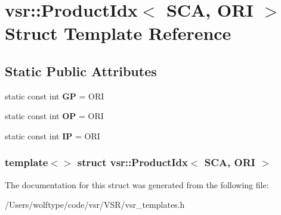 \hypertarget{structvsr_1_1_product_idx_3_01_s_c_a_00_01_o_r_i_01_4}{\section{vsr\-:\-:Product\-Idx$<$ S\-C\-A, O\-R\-I $>$ Struct Template Reference}
\label{structvsr_1_1_product_idx_3_01_s_c_a_00_01_o_r_i_01_4}
}
\subsection*{Static Public Attributes}
\begin{DoxyCompactItemize}
\item 
\hypertarget{structvsr_1_1_product_idx_3_01_s_c_a_00_01_o_r_i_01_4_a5668a20a179abd625125a80ebe708bb3}{static const int {\bfseries G\-P} = O\-R\-I}\label{structvsr_1_1_product_idx_3_01_s_c_a_00_01_o_r_i_01_4_a5668a20a179abd625125a80ebe708bb3}

\item 
\hypertarget{structvsr_1_1_product_idx_3_01_s_c_a_00_01_o_r_i_01_4_aa2df5051a9d344da1366535e6c73fe5a}{static const int {\bfseries O\-P} = O\-R\-I}\label{structvsr_1_1_product_idx_3_01_s_c_a_00_01_o_r_i_01_4_aa2df5051a9d344da1366535e6c73fe5a}

\item 
\hypertarget{structvsr_1_1_product_idx_3_01_s_c_a_00_01_o_r_i_01_4_a07ba26356ba41edc9a78b6bf79a5c5bb}{static const int {\bfseries I\-P} = O\-R\-I}\label{structvsr_1_1_product_idx_3_01_s_c_a_00_01_o_r_i_01_4_a07ba26356ba41edc9a78b6bf79a5c5bb}

\end{DoxyCompactItemize}
\subsubsection*{template$<$$>$ struct vsr\-::\-Product\-Idx$<$ S\-C\-A, O\-R\-I $>$}



The documentation for this struct was generated from the following file\-:\begin{DoxyCompactItemize}
\item 
/\-Users/wolftype/code/vsr/\-V\-S\-R/vsr\-\_\-templates.\-h\end{DoxyCompactItemize}
